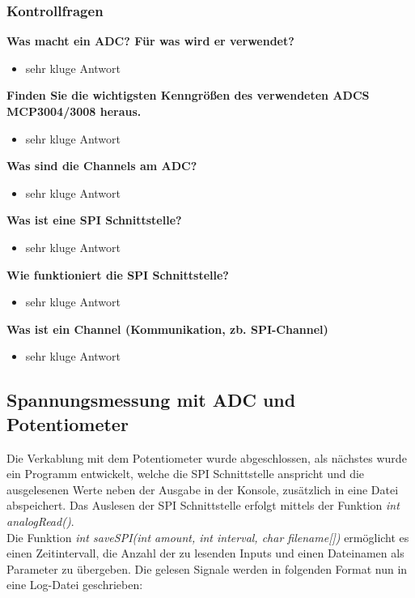 \documentclass{article}
\begin{document}
\newpage
\subsubsection{Kontrollfragen}

\textbf{Was macht ein ADC? Für was wird er verwendet?}
\begin{itemize}
    \item sehr kluge Antwort
\end{itemize}
\textbf{Finden Sie die wichtigsten Kenngrößen des verwendeten ADCS MCP3004/3008 heraus.}
\begin{itemize}
    \item sehr kluge Antwort
\end{itemize}
\textbf{Was sind die Channels am ADC?}
\begin{itemize}
    \item sehr kluge Antwort
\end{itemize}
\textbf{Was ist eine SPI Schnittstelle?}
\begin{itemize}
    \item sehr kluge Antwort
\end{itemize}
\textbf{Wie funktioniert die SPI Schnittstelle?}
\begin{itemize}
    \item sehr kluge Antwort
\end{itemize}
\textbf{Was ist ein Channel (Kommunikation, zb. SPI-Channel)}
\begin{itemize}
    \item sehr kluge Antwort
\end{itemize}

\newpage

\subsection{Spannungsmessung mit ADC und Potentiometer}
Die Verkablung mit dem Potentiometer wurde abgeschlossen, als nächstes wurde ein Programm entwickelt, welche die SPI Schnittstelle anspricht und die ausgelesenen Werte neben der Ausgabe in der Konsole, zusätzlich in eine Datei abspeichert.
Das Auslesen der SPI Schnittstelle erfolgt mittels der Funktion \textit{int analogRead()}. \\
Die Funktion \textit{int saveSPI(int amount, int interval, char filename[])} ermöglicht es einen Zeitintervall, die Anzahl der zu lesenden Inputs und einen Dateinamen als Parameter zu übergeben.
Die gelesen Signale werden in folgenden Format nun in eine Log-Datei geschrieben:
\end{document}
